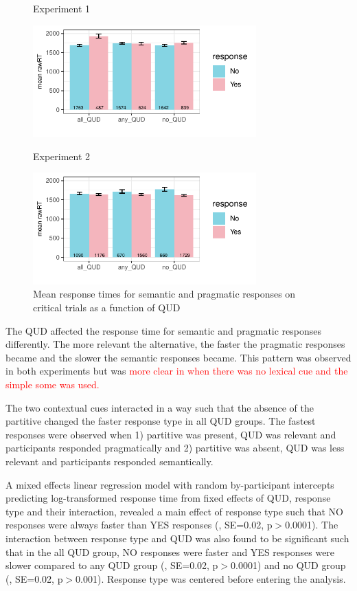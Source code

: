 \documentclass[12pt]{article}
\begin{document}
\begin{figure}[!ht] 
    \begin{minipage}{.5\textwidth}
        \caption*{Experiment 1}
        \includegraphics[height=4.3cm]{img/exp4_response_time.pdf}
    \end{minipage}%
    \begin{minipage}{.5\textwidth}
        \caption*{Experiment 2}
        \includegraphics[height=4.3cm]{img/exp5_response_time.pdf}
    \end{minipage}%
    \caption{Mean response times for semantic and pragmatic responses on critical trials as a function of QUD}
\end{figure}

The QUD affected the response time for semantic and pragmatic responses differently. The more relevant the alternative, the faster the pragmatic responses became and the slower the semantic responses became. This pattern was observed in both experiments but was \textcolor{red}{more clear in when there was no lexical cue and the simple some was used.}

The two contextual cues interacted in a way such that the absence of the partitive changed the faster response type in all QUD groups. The fastest responses were observed when 1) partitive was present, QUD was relevant and participants responded pragmatically and 2) partitive was absent, QUD was less relevant and participants responded semantically. 

A mixed effects linear regression model with random by-participant intercepts predicting log-transformed response time from fixed effects of QUD, response type and their interaction, revealed a main effect of response type such that NO responses were always faster than YES responses (, SE=0.02, p$>$0.0001). The interaction between response type and QUD was also found to be significant such that in the all QUD group, NO responses were faster and YES responses were slower compared to any QUD group (, SE=0.02, p$>$0.0001) and no QUD group (, SE=0.02, p$>$0.001). Response type was centered before entering the analysis.
\end{document}
